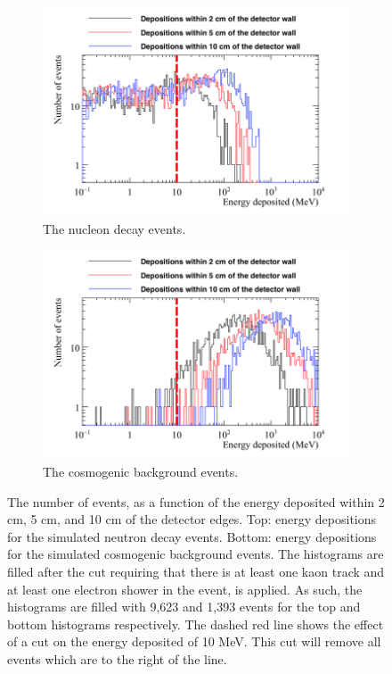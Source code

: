 \begin{figure}
  \centering
  \begin{subfigure}{0.75\textwidth}
    \centering
    \includegraphics[width=\textwidth]{NucleonDecay_EDepNearEdges}
    \caption{The nucleon decay events.}
    \label{fig:NDK_EDepNearEdge_Sig}
  \end{subfigure}
  \begin{subfigure}{0.75\textwidth}
    \centering
    \includegraphics[width=\textwidth]{CosmicBackground_EDepNearEdges}
    \caption{The cosmogenic background events.}
    \label{fig:NDK_EDepNearEdge_Bk}
  \end{subfigure}
  \caption[The number of events, as a function of the energy deposited within 2 cm, 5 cm, and 10 cm of the detector edges.]
          {The number of events, as a function of the energy deposited within 2 cm, 5 cm, and 10 cm of the detector edges. Top: energy depositions for the simulated neutron decay events. Bottom: energy depositions for the simulated cosmogenic background events. The histograms are filled after the cut requiring that there is at least one kaon track and at least one electron shower in the event, is applied. As such, the histograms are filled with 9,623 and 1,393 events for the top and bottom histograms respectively. The dashed red line shows the effect of a cut on the energy deposited of 10 MeV. This cut will remove all events which are to the right of the line.}
  \label{fig:NDK_EDepNearEdge}
\end{figure}

